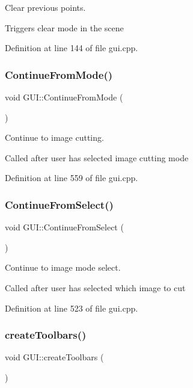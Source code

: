 Clear previous points. 

Triggers clear mode in the scene 

Definition at line 144 of file gui.\+cpp.

\mbox{\label{classGUI_a3547730e0fae81b59fcb19d00a370782}} 
\subsubsection{\texorpdfstring{Continue\+From\+Mode()}{ContinueFromMode()}}
{\footnotesize\ttfamily void G\+U\+I\+::\+Continue\+From\+Mode (\begin{DoxyParamCaption}{ }\end{DoxyParamCaption})}



Continue to image cutting. 

Called after user has selected image cutting mode 

Definition at line 559 of file gui.\+cpp.

\mbox{\label{classGUI_a0cddf3859f457495040857f4868f32e3}} 
\subsubsection{\texorpdfstring{Continue\+From\+Select()}{ContinueFromSelect()}}
{\footnotesize\ttfamily void G\+U\+I\+::\+Continue\+From\+Select (\begin{DoxyParamCaption}{ }\end{DoxyParamCaption})}



Continue to image mode select. 

Called after user has selected which image to cut 

Definition at line 523 of file gui.\+cpp.

\mbox{\label{classGUI_a26cdc4a989f3637301f0afb9cc5e23b0}} 
\subsubsection{\texorpdfstring{create\+Toolbars()}{createToolbars()}}
{\footnotesize\ttfamily void G\+U\+I\+::create\+Toolbars (\begin{DoxyParamCaption}{ }\end{DoxyParamCaption})}



